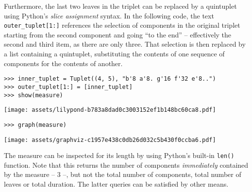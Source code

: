 \noindent Furthermore, the last two leaves in the triplet can be replaced by a
quintuplet using Python's \emph{slice assignment} syntax. In the following
code, the text \texttt{outer\_tuplet[1:]} references the selection of
components in the original triplet starting from the second component and going
\enquote{to the end} -- effectively the second and third item, as there are
only three. That selection is then replaced by a list containing a quintuplet,
substituting the contents of one sequence of components for the contents of
another.

\begin{comment}
<abjad>
inner_tuplet = Tuplet((4, 5), "b'8 a'8. g'16 f'32 e'8..")
outer_tuplet[1:] = [inner_tuplet]
show(measure)
</abjad>
\end{comment}

\begin{abjadbookoutput}
\begin{singlespacing}
\vspace{-0.5\baselineskip}
\begin{verbatim}
>>> inner_tuplet = Tuplet((4, 5), "b'8 a'8. g'16 f'32 e'8..")
>>> outer_tuplet[1:] = [inner_tuplet]
>>> show(measure)
\end{verbatim}
\noindent\texttt{[image: assets/lilypond-b783a8dad0c3003152ef1b148bc60ca8.pdf]}
\end{singlespacing}
\end{abjadbookoutput}

\begin{comment}
<abjad>
graph(measure)
</abjad>
\end{comment}

\begin{abjadbookoutput}
\begin{singlespacing}
\vspace{-0.5\baselineskip}
\begin{verbatim}
>>> graph(measure)
\end{verbatim}
\noindent\texttt{[image: assets/graphviz-c1957e438c0db26d032c5b430f0ccba6.pdf]}
\end{singlespacing}
\end{abjadbookoutput}

\noindent The measure can be inspected for its length by using Python's
built-in \texttt{len()} function. Note that this returns the number of
components \emph{immediately} contained by the measure -- 3 --, but not the
total number of components, total number of leaves or total duration. The
latter queries can be satisfied by other means.

